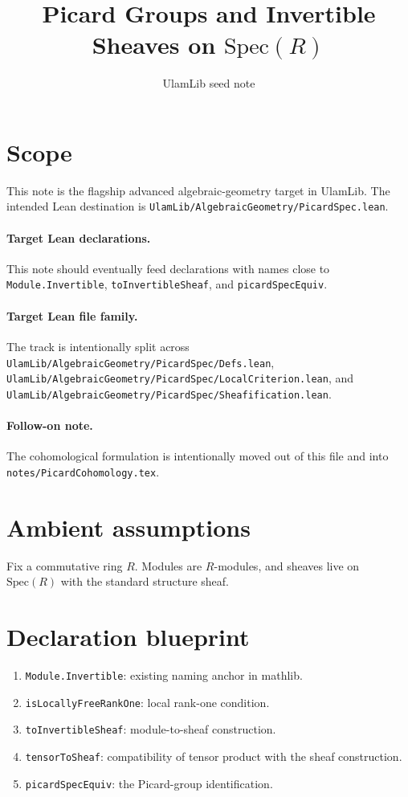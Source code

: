 \documentclass[11pt]{article}
\title{Picard Groups and Invertible Sheaves on $\mathrm{Spec}(R)$}
\author{UlamLib seed note}
\date{}
\begin{document}
\maketitle

\section{Scope}

This note is the flagship advanced algebraic-geometry target in UlamLib. The
intended Lean destination is
\texttt{UlamLib/AlgebraicGeometry/PicardSpec.lean}.

\paragraph{Target Lean declarations.}
This note should eventually feed declarations with names close to
\texttt{Module.Invertible}, \texttt{toInvertibleSheaf}, and
\texttt{picardSpecEquiv}.

\paragraph{Target Lean file family.}
The track is intentionally split across
\texttt{UlamLib/AlgebraicGeometry/PicardSpec/Defs.lean},
\texttt{UlamLib/AlgebraicGeometry/PicardSpec/LocalCriterion.lean}, and
\texttt{UlamLib/AlgebraicGeometry/PicardSpec/Sheafification.lean}.

\paragraph{Follow-on note.}
The cohomological formulation is intentionally moved out of this file and into
\texttt{notes/PicardCohomology.tex}.

\section{Ambient assumptions}

Fix a commutative ring $R$. Modules are $R$-modules, and sheaves live on
$\mathrm{Spec}(R)$ with the standard structure sheaf.

\section{Declaration blueprint}

\begin{enumerate}
\item \texttt{Module.Invertible}: existing naming anchor in mathlib.
\item \texttt{isLocallyFreeRankOne}: local rank-one condition.
\item \texttt{toInvertibleSheaf}: module-to-sheaf construction.
\item \texttt{tensorToSheaf}: compatibility of tensor product with the sheaf
construction.
\item \texttt{picardSpecEquiv}: the Picard-group identification.
\end{enumerate}
\end{document}
